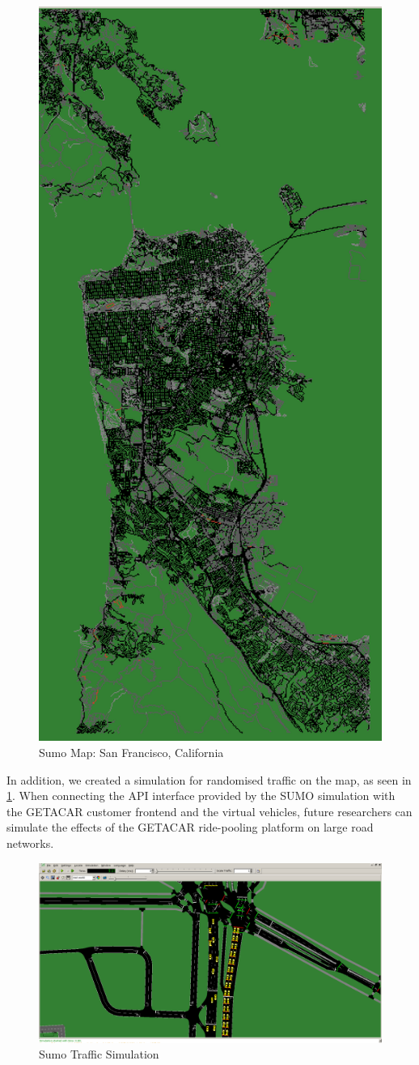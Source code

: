 \begin{figure}[h]
    \centering
    \includegraphics[width=0.40\linewidth]{data/ffss/sumo2.png}
    \caption{Sumo Map: San Francisco, California}
    \label{fig:Sumo2}
\end{figure}



In addition, we created a simulation for randomised traffic on the map, as seen in \ref{fig:Sumo2}. When connecting the API interface provided by the SUMO simulation with the GETACAR customer frontend and the virtual vehicles, future researchers can simulate the effects of the GETACAR ride-pooling platform on large road networks.

\begin{figure}[h]
    \centering
    \includegraphics[width=0.90\linewidth]{data/ffss/sumo1.png}
    \caption{Sumo Traffic Simulation}
    \label{fig:Sumo1}
\end{figure}






